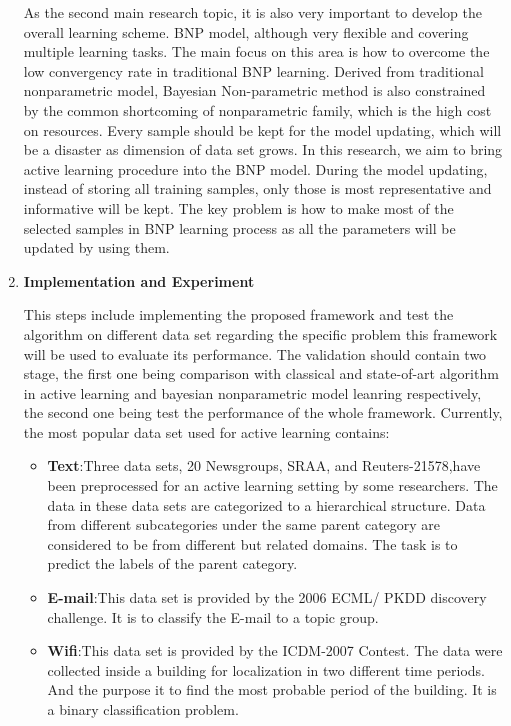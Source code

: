 \begin{enumerate}
 As the second main research topic, it is also very important to develop the overall learning scheme. BNP model, although very flexible and covering multiple learning tasks. The main focus on this area is how to overcome the low convergency rate in traditional BNP learning. Derived from traditional nonparametric model, Bayesian Non-parametric method is also constrained by the common shortcoming of nonparametric family, which is the high cost on resources\cite{ghosh1982nonparametric,vapnik1998statistical}. Every sample should be kept for the model updating, which will be a disaster as dimension of data set grows. In this research, we aim to bring active learning procedure into the BNP model. During the model updating, instead of storing all training samples, only those is most representative and informative will be kept. The key problem is how to make most of the selected samples in BNP learning process as all the parameters will be updated by using them.  
 \item \textbf{Implementation and Experiment}
 
 This steps include implementing the proposed framework and test the algorithm on different data set regarding the specific problem this framework will be used to evaluate its performance. The validation should contain two stage, the first one being comparison with classical and state-of-art algorithm in active learning and bayesian nonparametric model leanring respectively, the second one being test the performance of the whole framework. Currently, the most popular data set used for active learning contains:
 \begin{itemize}
 \item{\textbf{Text}}:Three data sets, 20 Newsgroups, SRAA, and Reuters-21578,have been preprocessed for an active learning setting by some researchers. The data in these data sets are categorized to a hierarchical structure. Data from different subcategories under the same parent category are considered to be from different but related domains. The task is to predict the labels of the parent category.
 \item{\textbf{E-mail}}:This data set is provided by the 2006 ECML/ PKDD discovery challenge. It is to classify the E-mail to a topic group.
 \item{\textbf{Wifi}}:This data set is provided by the ICDM-2007 Contest.
 The data were collected inside a building for localization in two
different time periods. And the purpose it to find the most probable period of the building. It is a binary classification problem.
 \end{itemize}
 

\end{enumerate}
